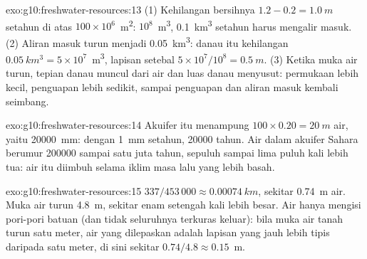 \begin{solution}{exo:g10:freshwater-resources:13}
(1) Kehilangan bersihnya $1.2 - 0.2 = \qty{1.0}{m}$ setahun di atas
$100 \times 10^6$~\unit{m^2}: $10^8$~\unit{m^3}, \qty{0.1}{km^3} setahun harus
mengalir masuk. (2) Aliran masuk turun menjadi \qty{0.05}{km^3}: danau itu
kehilangan $\qty{0.05}{km^3} = 5 \times 10^7$~\unit{m^3}, lapisan setebal
$5 \times 10^7/10^8 = \qty{0.5}{m}$. (3) Ketika muka air turun, tepian
danau muncul dari air dan luas danau menyusut: permukaan lebih kecil,
penguapan lebih sedikit, sampai penguapan dan aliran masuk kembali seimbang.
\end{solution}

\begin{solution}{exo:g10:freshwater-resources:14}
Akuifer itu menampung $100 \times 0.20 = \qty{20}{m}$ air, yaitu
\qty{20000}{mm}: dengan \qty{1}{mm} setahun, \num{20000} tahun. Air dalam
akuifer Sahara berumur \num{200000} sampai satu juta tahun, sepuluh sampai lima
puluh kali lebih tua: air itu diimbuh selama iklim masa lalu yang lebih basah.
\end{solution}

\begin{solution}{exo:g10:freshwater-resources:15}
$337/453\,000 \approx \qty{0.00074}{km}$, sekitar \qty{0.74}{m} air. Muka air
turun \qty{4.8}{m}, sekitar enam setengah kali lebih besar. Air hanya mengisi
pori-pori batuan (dan tidak seluruhnya terkuras keluar): bila muka air tanah
turun satu meter, air yang dilepaskan adalah lapisan yang jauh lebih tipis
daripada satu meter, di sini sekitar $0.74/4.8 \approx \num{0.15}$~m.
\end{solution}

